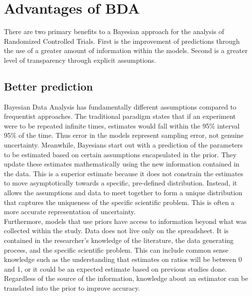 \documentclass{article}
\begin{document}
\section{Advantages of BDA}
There are two primary benefits to a Bayesian approach for the analysis of Randomized Controlled Trials. First is the improvement of predictions through the use of a greater amount of information within the models. Second is a greater level of transparency through explicit assumptions. 
\subsection{Better prediction}
Bayesian Data Analysis has fundamentally different assumptions compared to frequentist approaches. The traditional paradigm states that if an experiment were to be repeated infinite times, estimates would fall within the 95\% interval 95\% of the time. Thus error in the models represent sampling error, not genuine uncertainty. Meanwhile, Bayesians start out with a prediction of the parameters to be estimated based on certain assumptions encapsulated in the prior. They update these estimates mathematically using the new information contained in the data. This is a superior estimate because it does not constrain the estimates to move asymptotically towards a specific, pre-defined distribution. Instead, it allows the assumptions and data to meet together to form a unique distribution that captures the uniqueness of the specific scientific problem. This is often a more accurate representation of uncertainty.\\

Furthermore, models that use priors have access to information beyond what was collected within the study. Data does not live only on the spreadsheet. It is contained in the researcher's knowledge of the literature, the data generating process, and the specific scientific problem. This can include common sense knowledge such as the understanding that estimates on ratios will be between 0 and 1, or it could be an expected estimate based on previous studies done. Regardless of the source of the information, knowledge about an estimator can be translated into the prior to improve accuracy. \\ 
\end{document}
